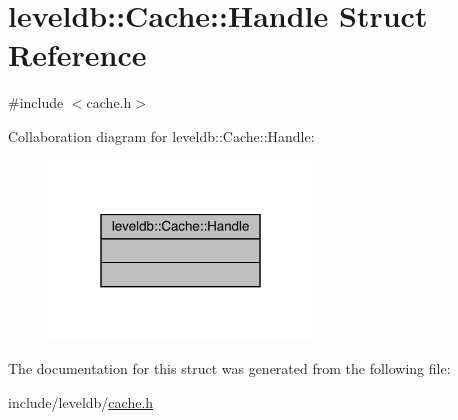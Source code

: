 \hypertarget{structleveldb_1_1_cache_1_1_handle}{}\section{leveldb\+::Cache\+::Handle Struct Reference}
\label{structleveldb_1_1_cache_1_1_handle}


{\ttfamily \#include $<$cache.\+h$>$}



Collaboration diagram for leveldb\+::Cache\+::Handle\+:
\nopagebreak
\begin{figure}[H]
\begin{center}
\leavevmode
\includegraphics[width=199pt]{structleveldb_1_1_cache_1_1_handle__coll__graph}
\end{center}
\end{figure}


The documentation for this struct was generated from the following file\+:\begin{DoxyCompactItemize}
\item 
include/leveldb/\mbox{\hyperlink{cache_8h}{cache.\+h}}\end{DoxyCompactItemize}
